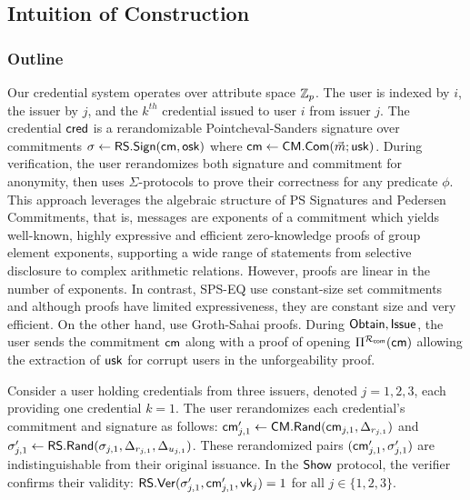 \subsection{Intuition of Construction}

\subsubsection{Outline}
Our credential system operates over attribute space $\mathbb{Z}_p$. The user is indexed by $i$, the issuer by $j$, and the $k^{th}$ credential issued to user $i$ from issuer $j$. The credential $\mathsf{cred}$ is a rerandomizable Pointcheval-Sanders signature over commitments $\sigma \gets \mathsf{RS.Sign}(\mathsf{cm}, \mathsf{osk})$ where $\mathsf{cm} \gets \mathsf{CM.Com}(\vec{m}; \mathsf{usk})$. During verification, the user rerandomizes both signature and commitment for anonymity, then uses $\Sigma$-protocols to prove their correctness for any predicate $\phi$. This approach leverages the algebraic structure of PS Signatures and Pedersen Commitments, that is, messages are exponents of a commitment which yields well-known, highly expressive and efficient zero-knowledge proofs of group element exponents, supporting a wide range of statements from selective disclosure to complex arithmetic relations. However, proofs are linear in the number of exponents. In contrast, SPS-EQ \cite{fuchsbauer_structure-preserving_2019, hanaoka_improved_2022} use constant-size set commitments and although proofs have limited expressiveness, they are constant size and very efficient. On the other hand, \cite{rabaninejad_attribute-based_2024} use Groth-Sahai proofs. During $\mathsf{Obtain}, \mathsf{Issue}$, the user sends the commitment $\mathsf{cm}$ along with a proof of opening $\Pi^{\mathcal{R}_{\mathsf{com}}}(\mathsf{cm})$ allowing the extraction of $\mathsf{usk}$ for corrupt users in the unforgeability proof.

Consider a user holding credentials from three issuers, denoted $j = 1, 2, 3$, each providing one credential $k = 1$. The user rerandomizes each credential’s commitment and signature as follows: $\mathsf{cm}_{j,1}' \gets \mathsf{CM.Rand}(\mathsf{cm}_{j,1}, \Delta_{r_{j,1}})$ and $\sigma_{j,1}' \gets \mathsf{RS.Rand}(\sigma_{j,1}, \Delta_{r_{j,1}}, \Delta_{u_{j,1}})$. These rerandomized pairs $(\mathsf{cm}_{j,1}', \sigma_{j,1}')$ are indistinguishable from their original issuance. In the $\mathsf{Show}$ protocol, the verifier confirms their validity: $\mathsf{RS.Ver}(\sigma_{j,1}', \mathsf{cm}_{j,1}', \mathsf{vk}_j) = 1$ for all $j \in \{1, 2, 3\}$.

